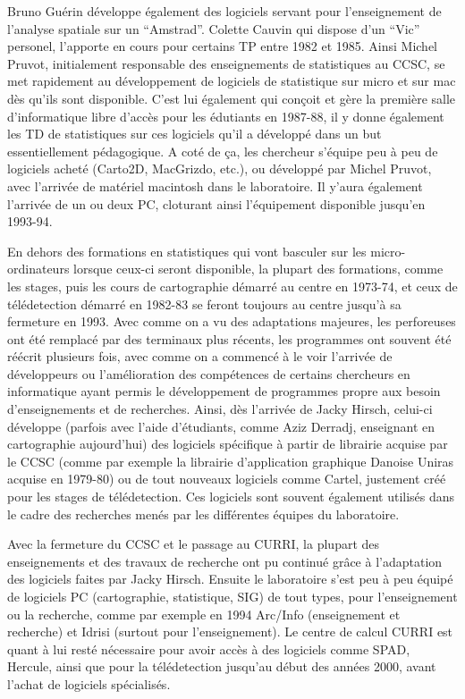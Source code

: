 Bruno Guérin développe également des logiciels servant pour l'enseignement de l'analyse spatiale sur un \enquote{Amstrad}. Colette Cauvin qui dispose d'un \enquote{Vic} personel, l'apporte en cours pour certains TP entre 1982 et 1985. Ainsi Michel Pruvot, initialement responsable des enseignements de statistiques au CCSC, se met rapidement au développement de logiciels de statistique sur micro et sur mac dès qu'ils sont disponible. C'est lui également qui conçoit et gère la première salle d'informatique libre d'accès pour les édutiants en 1987-88, il y donne également les TD de statistiques sur ces logiciels qu'il a développé dans un but essentiellement pédagogique. A coté de ça, les chercheur s'équipe peu à peu de logiciels acheté (Carto2D, MacGrizdo, etc.), ou développé par Michel Pruvot, avec l'arrivée de matériel macintosh dans le laboratoire. Il y'aura également l'arrivée de un ou deux PC, cloturant ainsi l'équipement disponible jusqu'en 1993-94.

En dehors des formations en statistiques qui vont basculer sur les micro-ordinateurs lorsque ceux-ci seront disponible, la plupart des formations, comme les stages, puis les cours de cartographie démarré au centre en 1973-74, et ceux de télédetection démarré en 1982-83 se feront toujours au centre jusqu'à sa fermeture en 1993. Avec comme on a vu des adaptations majeures, les perforeuses ont été remplacé par des terminaux plus récents, les programmes ont souvent été réécrit plusieurs fois, avec comme on a commencé à le voir l'arrivée de développeurs ou l'amélioration des compétences de certains chercheurs en informatique ayant permis le développement de programmes propre aux besoin d'enseignements et de recherches. Ainsi, dès l'arrivée de Jacky Hirsch, celui-ci développe (parfois avec l'aide d'étudiants, comme Aziz Derradj, enseignant en cartographie aujourd'hui) des logiciels spécifique à partir de librairie acquise par le CCSC (comme par exemple la librairie d'application graphique Danoise Uniras acquise en 1979-80) ou de tout nouveaux logiciels comme Cartel, justement créé pour les stages de télédetection. Ces logiciels sont souvent également utilisés dans le cadre des recherches menés par les différentes équipes du laboratoire.

Avec la fermeture du CCSC et le passage au CURRI, la plupart des enseignements et des travaux de recherche ont pu continué grâce à l'adaptation des logiciels faites par Jacky Hirsch. Ensuite le laboratoire s'est peu à peu équipé de logiciels PC (cartographie, statistique, SIG) de tout types, pour l'enseignement ou la recherche, comme par exemple en 1994 Arc/Info (enseignement et recherche) et Idrisi (surtout pour l'enseignement). Le centre de calcul CURRI est quant à lui resté nécessaire pour avoir accès à des logiciels comme SPAD, Hercule, ainsi que pour la télédetection jusqu'au début des années 2000, avant l'achat de logiciels spécialisés. 

